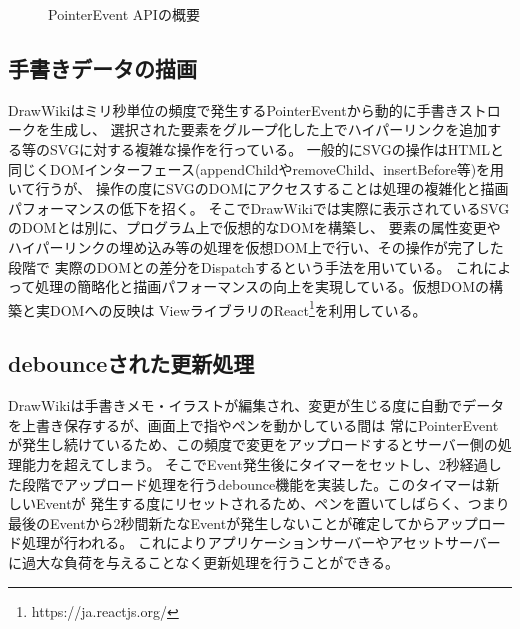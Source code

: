 \begin{figure}[htbp]
    \begin{center}
         \end{center}
    \caption{PointerEvent APIの概要} \label{pevent}
\end{figure}

\subsection{手書きデータの描画}
DrawWikiはミリ秒単位の頻度で発生するPointerEventから動的に手書きストロークを生成し、
選択された要素をグループ化した上でハイパーリンクを追加する等のSVGに対する複雑な操作を行っている。
一般的にSVGの操作はHTMLと同じくDOMインターフェース(appendChildやremoveChild、insertBefore等)を用いて行うが、
操作の度にSVGのDOMにアクセスすることは処理の複雑化と描画パフォーマンスの低下を招く。
そこでDrawWikiでは実際に表示されているSVGのDOMとは別に、プログラム上で仮想的なDOMを構築し、
要素の属性変更やハイパーリンクの埋め込み等の処理を仮想DOM上で行い、その操作が完了した段階で
実際のDOMとの差分をDispatchするという手法を用いている。
これによって処理の簡略化と描画パフォーマンスの向上を実現している。仮想DOMの構築と実DOMへの反映は
ViewライブラリのReact\footnote{https://ja.reactjs.org/}を利用している。

\subsection{debounceされた更新処理}
DrawWikiは手書きメモ・イラストが編集され、変更が生じる度に自動でデータを上書き保存するが、画面上で指やペンを動かしている間は
常にPointerEventが発生し続けているため、この頻度で変更をアップロードするとサーバー側の処理能力を超えてしまう。
そこでEvent発生後にタイマーをセットし、2秒経過した段階でアップロード処理を行うdebounce機能を実装した。このタイマーは新しいEventが
発生する度にリセットされるため、ペンを置いてしばらく、つまり最後のEventから2秒間新たなEventが発生しないことが確定してからアップロード処理が行われる。
これによりアプリケーションサーバーやアセットサーバーに過大な負荷を与えることなく更新処理を行うことができる。


